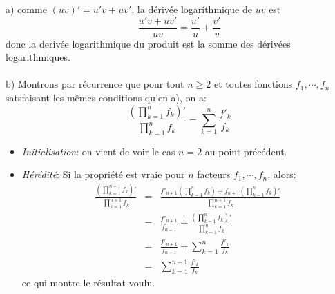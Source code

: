 a) comme $(uv)'=u'v+uv'$, la dérivée logarithmique de $uv$ est 
\[ \frac{u'v+uv'}{uv} = \frac{u'}{u} + \frac{v'}{v} 
\]
donc la derivée logarithmique du produit est la somme des dérivées logarithmiques.\\ \\
b) Montrons par récurrence que pour tout $n \geq 2 $ et toutes fonctions $f_1, \cdots, f_n$ satsfaisant les mêmes conditions qu'en a), on a:
\[
\frac{\left( \prod_{k=1}^{n}{f_k}\right)'}{\prod_{k=1}^{n}{f_k}} = \sum_{k=1}^n{\frac{f'_k}{f_k}}
\]
\begin{itemize}
  \item \textit{Initialisation}: on vient de voir le cas $n=2$ au point précédent.
  \item \textit{Hérédité}: Si la propriété est vraie pour $n$ facteurs $f_1, \cdots, f_n$, alors:
\begin{eqnarray*}
  \frac{\left( \prod_{k=1}^{n+1}{f_k}\right)'}{\prod_{k=1}^{n+1}{f_k}} &=&  \frac{f'_{n+1}\left( \prod_{k=1}^{n}{f_k}\right)+f_{n+1}\left( \prod_{k=1}^{n}{f_k}\right)'}{\prod_{k=1}^{n+1}{f_k}}   \\
  &=& \frac{f'_{n+1}}{f_{n+1}} + \frac{\left( \prod_{k=1}^{n}{f_k}\right)'}{\prod_{k=1}^{n}{f_k}} \\
  &=& \frac{f'_{n+1}}{f_{n+1}} + \sum_{k=1}^n{\frac{f'_k}{f_k}}\\
  &=& \sum_{k=1}^{n+1}{\frac{f'_k}{f_k}}
\end{eqnarray*}
ce qui montre le résultat voulu.
 \end{itemize}

